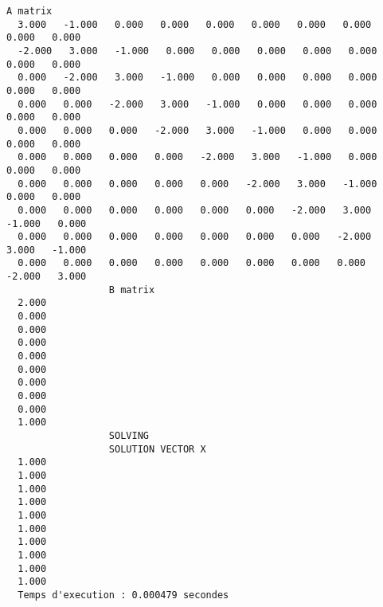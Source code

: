 \begin{lstlisting}[caption={$A_12X=B$} results, basicstyle=\fontsize{5}{8}\selectfont]
                  A matrix
  3.000   -1.000   0.000   0.000   0.000   0.000   0.000   0.000   0.000   0.000   
  -2.000   3.000   -1.000   0.000   0.000   0.000   0.000   0.000   0.000   0.000   
  0.000   -2.000   3.000   -1.000   0.000   0.000   0.000   0.000   0.000   0.000   
  0.000   0.000   -2.000   3.000   -1.000   0.000   0.000   0.000   0.000   0.000   
  0.000   0.000   0.000   -2.000   3.000   -1.000   0.000   0.000   0.000   0.000   
  0.000   0.000   0.000   0.000   -2.000   3.000   -1.000   0.000   0.000   0.000   
  0.000   0.000   0.000   0.000   0.000   -2.000   3.000   -1.000   0.000   0.000   
  0.000   0.000   0.000   0.000   0.000   0.000   -2.000   3.000   -1.000   0.000   
  0.000   0.000   0.000   0.000   0.000   0.000   0.000   -2.000   3.000   -1.000   
  0.000   0.000   0.000   0.000   0.000   0.000   0.000   0.000   -2.000   3.000   
                  B matrix
  2.000   
  0.000   
  0.000   
  0.000   
  0.000   
  0.000   
  0.000   
  0.000   
  0.000   
  1.000   
                  SOLVING
                  SOLUTION VECTOR X 
  1.000   
  1.000   
  1.000   
  1.000   
  1.000   
  1.000   
  1.000   
  1.000   
  1.000   
  1.000   
  Temps d'execution : 0.000479 secondes
\end{lstlisting}
% 


